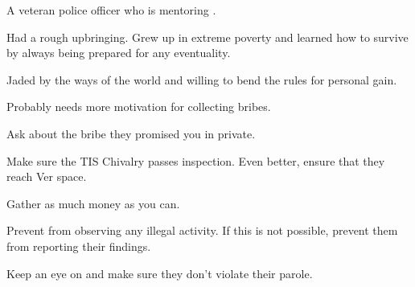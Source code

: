\documentclass[char]{guildcamp4}
\begin{document}
\name{\cCbad{}}

\begin{itemz}[Backstory]
    \item A veteran police officer who is mentoring \cCgood{}.
    \item Had a rough upbringing. Grew up in extreme poverty and learned how to survive by always being prepared for any eventuality.
    \item Jaded by the ways of the world and willing to bend the rules for personal gain.
    \item Probably needs more motivation for collecting bribes.
\end{itemz}

\begin{itemz}[Goals]
	\item Ask \cVone{} about the bribe they promised you in private.
	\item Make sure the TIS Chivalry passes inspection. Even better, ensure that they reach Ver space.
	\item Gather as much money as you can.
	\item Prevent \cCgood{} from observing any illegal activity. If this is not possible, prevent them from reporting their findings.
	\item Keep an eye on \cProbie{} and make sure they don't violate their parole. 
\end{itemz}

\begin{itemz}[Notes]
	\item 
\end{itemz}

\begin{contacts}
	\contact{\cTest{}}
\end{contacts}
\end{document}
